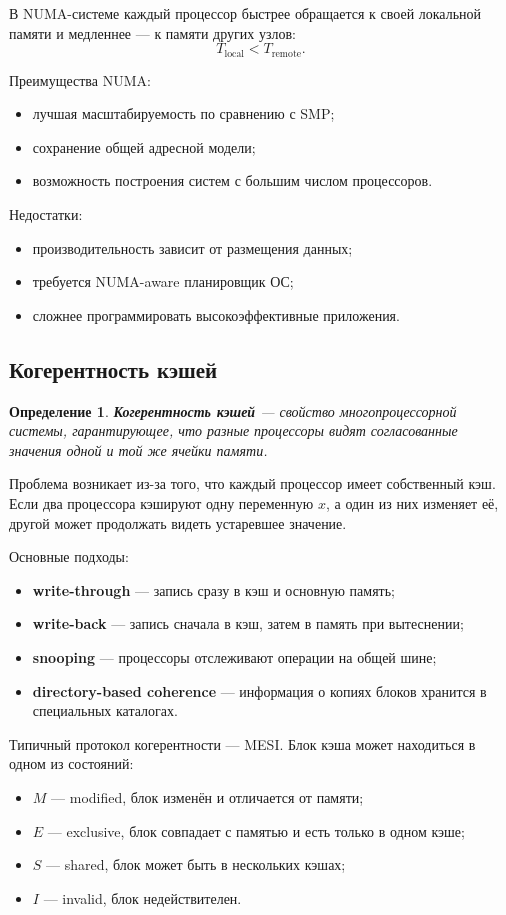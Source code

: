\documentclass[12pt,a4paper]{article}
\newtheorem{definition}{Определение}
\begin{document}
В NUMA-системе каждый процессор быстрее обращается к своей локальной памяти и медленнее --- к памяти других узлов:
\[
T_{\text{local}} < T_{\text{remote}}.
\]

Преимущества NUMA:
\begin{itemize}
    \item лучшая масштабируемость по сравнению с SMP;
    \item сохранение общей адресной модели;
    \item возможность построения систем с большим числом процессоров.
\end{itemize}

Недостатки:
\begin{itemize}
    \item производительность зависит от размещения данных;
    \item требуется NUMA-aware планировщик ОС;
    \item сложнее программировать высокоэффективные приложения.
\end{itemize}

\subsection{Когерентность кэшей}

\begin{definition}
\textbf{Когерентность кэшей} --- свойство многопроцессорной системы, гарантирующее, что разные процессоры видят согласованные значения одной и той же ячейки памяти.
\end{definition}

Проблема возникает из-за того, что каждый процессор имеет собственный кэш. Если два процессора кэшируют одну переменную $x$, а один из них изменяет её, другой может продолжать видеть устаревшее значение.

Основные подходы:
\begin{itemize}
    \item \textbf{write-through} --- запись сразу в кэш и основную память;
    \item \textbf{write-back} --- запись сначала в кэш, затем в память при вытеснении;
    \item \textbf{snooping} --- процессоры отслеживают операции на общей шине;
    \item \textbf{directory-based coherence} --- информация о копиях блоков хранится в специальных каталогах.
\end{itemize}

Типичный протокол когерентности --- MESI. Блок кэша может находиться в одном из состояний:
\begin{itemize}
    \item $M$ --- modified, блок изменён и отличается от памяти;
    \item $E$ --- exclusive, блок совпадает с памятью и есть только в одном кэше;
    \item $S$ --- shared, блок может быть в нескольких кэшах;
    \item $I$ --- invalid, блок недействителен.
\end{itemize}
\end{document}

